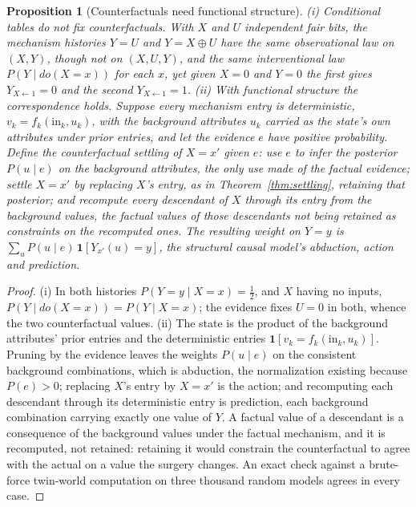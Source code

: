 \documentclass[11pt]{article}
\newtheorem{proposition}{Proposition}
\begin{document}
\begin{proposition}[Counterfactuals need functional structure]\label{prop:cf}
(i) Conditional tables do not fix counterfactuals. With $X$ and $U$ independent fair bits, the mechanism histories $Y = U$ and $Y = X \oplus U$ have the same observational law on $(X, Y)$, though not on $(X, U, Y)$, and the same interventional law $P(Y \mid do(X = x))$ for each $x$, yet given $X = 0$ and $Y = 0$ the first gives $Y_{X \leftarrow 1} = 0$ and the second $Y_{X \leftarrow 1} = 1$.
(ii) With functional structure the correspondence holds. Suppose every mechanism entry is deterministic, $v_k = f_k(\mathrm{in}_k, u_k)$, with the background attributes $u_k$ carried as the state's own attributes under prior entries, and let the evidence $e$ have positive probability. Define the counterfactual settling of $X = x'$ given $e$: use $e$ to infer the posterior $P(u \mid e)$ on the background attributes, the only use made of the factual evidence; settle $X = x'$ by replacing $X$'s entry, as in Theorem~\ref{thm:settling}, retaining that posterior; and recompute every descendant of $X$ through its entry from the background values, the factual values of those descendants not being retained as constraints on the recomputed ones. The resulting weight on $Y = y$ is $\sum_u P(u \mid e)\,\mathbf{1}[Y_{x'}(u) = y]$, the structural causal model's abduction, action and prediction.
\end{proposition}
\begin{proof}
(i) In both histories $P(Y = y \mid X = x) = \tfrac12$, and $X$ having no inputs, $P(Y \mid do(X = x)) = P(Y \mid X = x)$; the evidence fixes $U = 0$ in both, whence the two counterfactual values. (ii) The state is the product of the background attributes' prior entries and the deterministic entries $\mathbf{1}[v_k = f_k(\mathrm{in}_k, u_k)]$. Pruning by the evidence leaves the weights $P(u \mid e)$ on the consistent background combinations, which is abduction, the normalization existing because $P(e) > 0$; replacing $X$'s entry by $X = x'$ is the action; and recomputing each descendant through its deterministic entry is prediction, each background combination carrying exactly one value of $Y$. A factual value of a descendant is a consequence of the background values under the factual mechanism, and it is recomputed, not retained: retaining it would constrain the counterfactual to agree with the actual on a value the surgery changes. An exact check against a brute-force twin-world computation on three thousand random models agrees in every case.
\end{proof}
\end{document}

